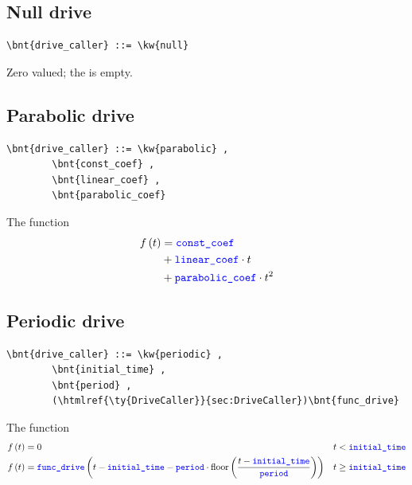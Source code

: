 \subsection{Null drive}
\begin{Verbatim}[commandchars=\\\{\}]
    \bnt{drive_caller} ::= \kw{null}
\end{Verbatim}
Zero valued; the  is empty.

\subsection{Parabolic drive}
\begin{Verbatim}[commandchars=\\\{\}]
    \bnt{drive_caller} ::= \kw{parabolic} ,
        \bnt{const_coef} , 
        \bnt{linear_coef} , 
        \bnt{parabolic_coef}
\end{Verbatim}
The function
\begin{align}
	f\left( t \right) &= \textcolor{blue}{\texttt{const\_coef}} \nonumber \\
		&+ \textcolor{blue}{\texttt{linear\_coef}} \cdot t \nonumber \\
		&+ \textcolor{blue}{\texttt{parabolic\_coef}} \cdot t^2
\end{align}

\subsection{Periodic drive}
\begin{Verbatim}[commandchars=\\\{\}]
    \bnt{drive_caller} ::= \kw{periodic} ,
        \bnt{initial_time} ,
        \bnt{period} ,
        (\htmlref{\ty{DriveCaller}}{sec:DriveCaller})\bnt{func_drive}
\end{Verbatim}
The function
\begin{align}
	f\left( t \right)
	&=
	0
	& t < \textcolor{blue}{\texttt{initial\_time}}
	\nonumber \\
	f\left( t \right)
	&=
	\textcolor{blue}{\texttt{func\_drive}}\left( 
		t
		-
		\textcolor{blue}{\texttt{initial\_time}}
		-
		\textcolor{blue}{\texttt{period}} \cdot \textrm{floor}\left( \frac{t - \textcolor{blue}{\texttt{initial\_time}}}{\textcolor{blue}{\texttt{period}}} \right)
	 \right)
	&
	t \ge \textcolor{blue}{\texttt{initial\_time}}
\end{align}

